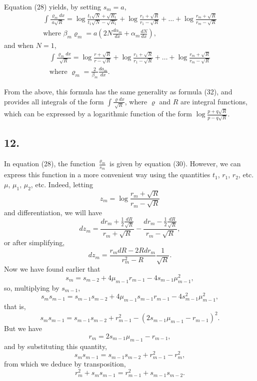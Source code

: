 \documentclass[oneside, 12 pt, leqno]{memoir}
\begin{document}
Equation (28) yields, by setting \( s_m = a \),
\begin{gather*}
\tag{32} \int \frac{\varrho_m dx}{a \sqrt{R}} = \log \frac{t_1 \sqrt{N} + \sqrt{R_1}}{t_1 \sqrt{N} - \sqrt{R_1}} + \log \frac{r_1 + \sqrt{R}}{r_1 - \sqrt{R}} + \dots + \log \frac{r_m + \sqrt{R}}{r_m - \sqrt{R}} \\
\text{where } \beta_m \varrho_m = a \left( 2N \frac{d \alpha_m}{d x} + \alpha_m \frac{dN}{dx} \right),
\end{gather*}
and when \( N = 1 \),
\begin{gather*}
\tag{33} \int \frac{\varrho_m dx}{\sqrt{R}} = \log \frac{r + \sqrt{R}}{r - \sqrt{R}} + \log \frac{r_1 + \sqrt{R}}{r_1 - \sqrt{R}} + \dots + \log \frac{r_m + \sqrt{R}}{r_m - \sqrt{R}} \\
\text{where } \varrho_m = \frac{2}{\beta_m} \frac{da_m}{dx}.
\end{gather*}

From the above, this formula has the same generality as formula (32), and provides all integrals of the form \(\int \frac{\varrho d x}{\sqrt{R}}\), where \(\varrho\) and \(R\) are integral functions, which can be expressed by a logarithmic function of the form \(\log \frac{p+q \sqrt{R}}{p-q \sqrt{R}}\).

\subsection*{12.}

In equation (28), the function \(\frac{\varrho_m}{s_m}\) is given by equation (30). However, we can express this function in a more convenient way using the quantities \(t_1\), \(r_1\), \(r_2\), etc. \(\mu\), \(\mu_1\), \(\mu_2\), etc. Indeed, letting
\[z_m=\log \frac{r_m+\sqrt{R}}{r_m-\sqrt{R}}\]
and differentiation, we will have 
\[d z_m=\frac{d r_m+\frac{1}{2} \frac{d R}{\sqrt{R}}}{r_m+\sqrt{R}}-\frac{d r_m-\frac{1}{2} \frac{d R}{\sqrt{R}}}{r_m-\sqrt{R}},\]
or after simplifying,
\[\tag{33'}d z_m=\frac{r_m d R-2 R d r_m}{r_m^2-R} \frac{1}{\sqrt{R}}.\]
Now we have found earlier that
\[s_m=s_{m-2}+4 \mu_{m-1} r_{m-1}-4 s_{m-1} \mu_{m-1}^2,\]
so, multiplying by \(s_{m-1}\),
\[s_m s_{m-1}=s_{m-1} s_{m-2}+4 \mu_{m-1} s_{m-1} r_{m-1}-4 s_{m-1}^2 \mu_{m-1}^2,\]
that is,
\[s_m s_{m-1}=s_{m-1} s_{m-2}+r_{m-1}^2-\left(2 s_{m-1} \mu_{m-1}-r_{m-1}\right)^2.\]
But we have
\[r_m=2 s_{m-1} \mu_{m-1}-r_{m-1},\]
and by substituting this quantity,
\[s_m s_{m-1}=s_{m-1} s_{m-2}+r_{m-1}^2-r_m^2,\]
from which we deduce by transposition,
\[r_m^2+s_m s_{m-1}=r_{m-1}^2+s_{m-1} s_{m-2}.\]
\end{document}
